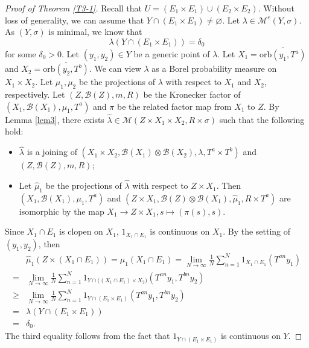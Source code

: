 \documentclass[reqno,12pt]{amsart}
\def\B {\mathcal B}
\numberwithin{equation}{section}
\begin{document}
\begin{proof}[Proof of Theorem \ref{T3-1}]
	Recall that $U=(E_1\times E_1)\cup (E_2\times E_2)$. Without loss of generality, we can assume that $Y\cap (E_1\times E_1)\neq \varnothing$. Let $\lambda\in \mathcal{M}^{e}(Y,\sigma)$. As $(Y,\sigma)$ is minimal, we know that $$\lambda(Y\cap (E_1\times E_1))=\delta_0$$
	for some $\delta_0>0$. Let $(y_1,y_2)\in Y$ be a generic point of $\lambda$. Let $X_1=\overline{\text{orb}(y_1,T^a)}$ and $X_2=\overline{\text{orb}(y_2,T^b)}$. We can view $\lambda$ as a Borel probability measure on $X_1\times X_2$. Let $\mu_1,\mu_2$ be the projections of $\lambda$ with respect to $X_1$ and $X_2$, respectively. Let $(Z,\B(Z),m,R)$ be the Kronecker factor of $(X_1,\B(X_1),\mu_1,T^a)$ and $\pi$ be the related factor map from $X_1$ to $Z$. By Lemma \ref{lem3}, there exists $\hat{\lambda}\in \mathcal{M}(Z\times X_1\times X_2,R\times \sigma)$ such that the following hold:
	\begin{itemize}
		\item $\hat{\lambda}$ is a joining of $(X_1\times X_2,\B(X_1)\otimes \B(X_2),\lambda,T^a\times T^b)$ and $(Z,\B(Z),m,R)$;
		\item Let $\hat{\mu}_1$ be the projections of $\hat{\lambda}$ with respect to $Z\times X_1$. Then $(X_1,\B(X_1),\mu_1,T^a)$ and $(Z\times X_1,\B(Z)\otimes \B(X_1),\hat{\mu}_1,R\times T^a)$ are isomorphic by the map $X_1\to Z\times X_1,s\mapsto (\pi(s),s)$.
	\end{itemize}
	Since $X_1\cap E_1$ is clopen on $X_1$, $1_{X_1\cap E_1}$ is continuous on $X_1$. By the setting of $(y_1,y_2)$, then
	\begin{align*}
	 & \hat{\mu}_1(Z\times (X_1\cap E_1))=\mu_{1}(X_1\cap E_1)=\lim_{N\to\infty}\frac{1}{N}\sum_{n=1}^{N}1_{X_1\cap E_1}(T^{an}y_1)
	 \\ = &
	 \lim_{N\to\infty}\frac{1}{N}\sum_{n=1}^{N}1_{Y\cap \big((X_1\cap E_1)\times X_2\big)}(T^{an}y_1,T^{bn}y_2)
	 \\ \ge &
	 \lim_{N\to\infty}\frac{1}{N}\sum_{n=1}^{N}1_{Y\cap (E_1\times E_1)}(T^{an}y_1,T^{bn}y_2)
	 \\ = &
	 \lambda(Y\cap (E_1\times E_1))
	 \\ = &
	 \delta_0.
	\end{align*} The third equality follows from the fact that $1_{Y\cap (E_1\times E_1)}$ is  continuous on $Y$.
	

\end{proof}
\end{document}
